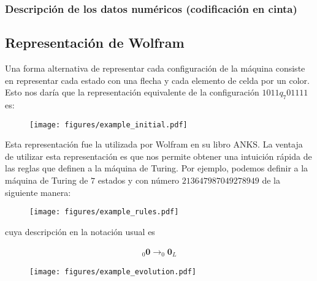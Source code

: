 \documentclass[10pt,a4paper]{article}
\begin{document}
\subsubsection{Descripción de los datos numéricos (codificación en cinta)}


\subsection{Representación de Wolfram}
Una forma alternativa de representar cada configuración de la máquina consiste en representar cada estado con una flecha y cada elemento de celda por un color. Esto nos daría que la representación equivalente de la configuración $1011q_7 01111$ es:
\begin{figure}[h!tb!]
	\centering
	\texttt{[image: figures/example\_initial.pdf]}
\end{figure}

Esta representación fue la utilizada por Wolfram en su libro ANKS. La ventaja de utilizar esta representación es que nos permite obtener una intuición rápida de las reglas que definen a la máquina de Turing. Por ejemplo, podemos definir a la máquina de Turing de $7$ estados y con número $213647987049278949$ de la siguiente manera:
\begin{figure}[h!tb!]
	\centering
	\texttt{[image: figures/example\_rules.pdf]}
\end{figure}
cuya descripción en la notación usual es

\begin{align*}
	_{0}\textbf{0} \rightarrow _{0}\textbf{0}_L
\end{align*}

\begin{figure}[h!tb!]
	\centering
	\texttt{[image: figures/example\_evolution.pdf]}
\end{figure}
\end{document}
